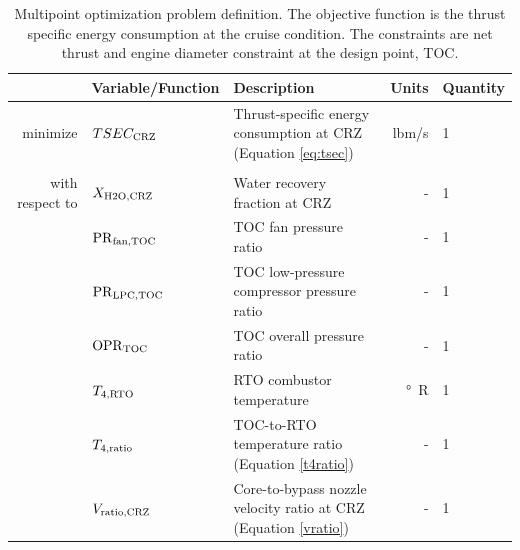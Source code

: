 \documentclass[conf]{new-aiaa}
\begin{document}
\begin{table}[hbt!]
    \centering
    \caption{
        Multipoint optimization problem definition.
        The objective function is the thrust specific energy consumption at the cruise condition.
        The constraints are net thrust and engine diameter constraint at the design point, TOC.
    }
    \small
    \renewcommand{\arraystretch}{1.2}
    \begin{tabular}{r l l r l}
        \toprule
                        & Variable/Function              & Description                                                           & Units          & Quantity \\
        \hline
        minimize        & $TSEC_{\rm{CRZ}} $             & Thrust-specific energy consumption at CRZ (Equation \eqref{eq:tsec})  & \si{lbm/s}     & 1        \\
                        &                                &                                                                       &                &          \\
        with respect to & $X_{\rm{H2O,CRZ}}$             & Water recovery fraction at CRZ                                        & -              & 1        \\
                        & $\rm{PR}_{\rm{fan,TOC}}$       & TOC fan pressure ratio                                                & -              & 1        \\
                        & $\rm{PR}_{\rm{LPC,TOC}}$       & TOC low-pressure compressor pressure ratio                            & -              & 1        \\
                        & $\rm{OPR}_{\rm{TOC}}$          & TOC overall pressure ratio                                            & -              & 1        \\
                        & $T_{4,\rm{RTO}}$               & RTO combustor temperature                                             & \si{\degree R} & 1        \\
                        & $T_{4,\rm{ratio}}$             & TOC-to-RTO temperature ratio (Equation \eqref{t4ratio})               & -              & 1        \\
                        & $V_{\rm{ratio,CRZ}}$           & Core-to-bypass nozzle velocity ratio at CRZ (Equation \eqref{vratio}) & -              & 1        \\

\end{tabular}
\end{table}
\end{document}

